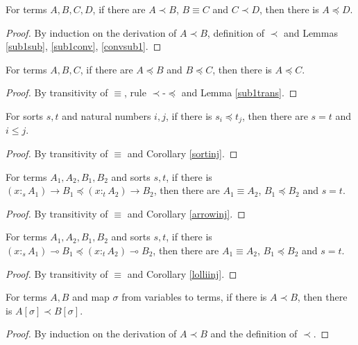 \documentclass[sigplan,screen,review,anonymous]{acmart}
\newcommand{\rname}[1]{\textsc{\footnotesize #1}}
\newcommand{\stype}[1]{:_#1}
\begin{document}
\begin{lemma}\label{sub1trans}
  For terms $A, B, C, D$, if there are $A \prec B$, $B \equiv C$ and $C \prec D$, then there is $A \preceq D$.
\end{lemma}
\begin{proof}
  By induction on the derivation of $A \prec B$, definition of $\prec$ and Lemmas \ref{sub1sub}, \ref{sub1conv}, \ref{convsub1}.
\end{proof}

\begin{lemma}
  For terms $A, B, C$, if there are $A \preceq B$ and $B \preceq C$, then there is $A \preceq C$.
\end{lemma}
\begin{proof}
  By transitivity of $\equiv$, rule \rname{$\prec$-$\preceq$} and Lemma \ref{sub1trans}.
\end{proof}

\begin{lemma}
  For sorts $s, t$ and natural numbers $i, j$, if there is $s_i \preceq t_j$, then there are $s = t$ and $i \leq j$.
\end{lemma}
\begin{proof}
  By transitivity of $\equiv$ and Corollary \ref{sortinj}.
\end{proof}

\begin{lemma}
  For terms $A_1, A_2, B_1, B_2$ and sorts $s, t$, if there is $(x \stype{s} A_1) \rightarrow B_1 \preceq (x \stype{t} A_2) \rightarrow B_2$, then there are $A_1 \equiv A_2$, $B_1 \preceq B_2$ and $s = t$.
\end{lemma}
\begin{proof}
  By transitivity of $\equiv$ and Corollary \ref{arrowinj}.
\end{proof}

\begin{lemma}
  For terms $A_1, A_2, B_1, B_2$ and sorts $s, t$, if there is $(x \stype{s} A_1) \multimap B_1 \preceq (x \stype{t} A_2) \multimap B_2$, then there are $A_1 \equiv A_2$, $B_1 \preceq B_2$ and $s = t$.
\end{lemma}
\begin{proof}
  By transitivity of $\equiv$ and Corollary \ref{lolliinj}.
\end{proof}

\begin{lemma}\label{sub1subst}
  For terms $A, B$  and map $\sigma$ from variables to terms, if there is $A \prec B$, then there is $A[\sigma] \prec B[\sigma]$.
\end{lemma}
\begin{proof}
  By induction on the derivation of $A \prec B$ and the definition of $\prec$.
\end{proof}
\end{document}
